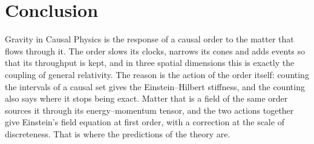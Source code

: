 \section{Conclusion}\label{sec:conclusion}

Gravity in Causal Physics is the response of a causal order to the matter that flows through it. The
order slows its clocks, narrows its cones and adds events so that its throughput is kept, and in three
spatial dimensions this is exactly the coupling of general relativity. The reason is the action of the
order itself: counting the intervals of a causal set gives the Einstein--Hilbert stiffness, and the
counting also says where it stops being exact. Matter that is a field of the same order sources it through its
energy--momentum tensor, and the two actions together give Einstein's field equation at first order, with a
correction at the scale of discreteness. That is where the predictions of the theory are.
